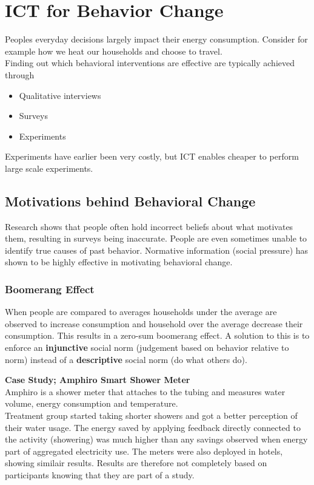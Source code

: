 \section{ICT for Behavior Change}
Peoples everyday decisions largely impact their energy consumption.
Consider for example how we heat our households and choose to travel.\\

Finding out which behavioral interventions are effective are typically achieved through
\begin{itemize}
    \item Qualitative interviews
    \item Surveys
    \item Experiments
\end{itemize}
Experiments have earlier been very costly, but ICT enables cheaper to perform large scale experiments.

\subsection{Motivations behind Behavioral Change}
Research shows that people often hold incorrect beliefs about what motivates them, resulting in surveys being inaccurate.
People are even sometimes unable to identify true causes of past behavior.
Normative information (social pressure) has shown to be highly effective in motivating behavioral change.

\subsubsection{Boomerang Effect}
When people are compared to averages households under the average are observed to increase consumption and household over the average decrease their consumption.
This results in a zero-sum boomerang effect.
A solution to this is to enforce an \textbf{injunctive} social norm (judgement based on behavior relative to norm) instead of a \textbf{descriptive} social norm (do what others do).

\begin{tcolorbox}
\textbf{Case Study; Amphiro Smart Shower Meter}\\
Amphiro is a shower meter that attaches to the tubing and measures water volume, energy consumption and temperature.\\

Treatment group started taking shorter showers and got a better perception of their water usage.
The energy saved by applying feedback directly connected to the activity (showering) was much higher than any savings observed when energy part of aggregated electricity use.
The meters were also deployed in hotels, showing similair results.
Results are therefore not completely based on participants knowing that they are part of a study.

\end{tcolorbox}

